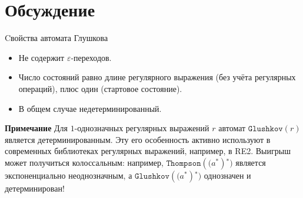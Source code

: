\documentclass[mathserif]{beamer}
\def\Glushkov{\mathtt{Glushkov}}
\def\Thompson{\mathtt{Thompson}}
\def\star{\ensuremath{^{*}}}%
\def\regexpstr#1{\mathtt{#1}}%
\newcommand{\empt}{\varepsilon} %
\begin{document}
\section{Обсуждение}
\begin{frame}{Cвойства автомата Глушкова}
  \begin{itemize}
    \item Не содержит $\empt$-переходов.
    \item Число состояний равно длине регулярного выражения (без учёта регулярных операций), плюс один (стартовое состояние).
    \item В общем случае недетерминированный.
  \end{itemize}

  \begin{alertblock}{\bf Примечание}
    Для $1$-однозначных регулярных выражений $r$ автомат $\Glushkov(r)$ является детерминированным. Эту его особенность активно используют в современных библиотеках регулярных выражений, например, в \textsc{RE2}. Выигрыш может получиться колоссальным: например, $\Thompson(\regexpstr(a\star)\star)$ является экспоненциально неоднозначным, а $\Glushkov(\regexpstr(a\star)\star)$ однозначен и детерминирован!
  \end{alertblock}%
\end{frame}
\end{document}
